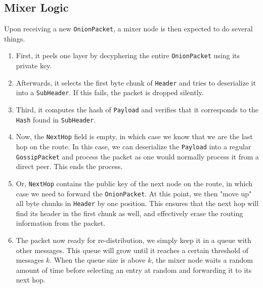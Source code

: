 \documentclass[11pt, a4paper]{article}
\begin{document}
            \subsection{Mixer Logic}\label{subsec:mixer-logic}

            Upon receiving a new \texttt{OnionPacket}, a mixer node is then expected to do several things.

            \begin{enumerate}
                \item First, it peels one layer by decyphering the entire \texttt{OnionPacket} using its private key.

                \item Afterwards, it selects the first byte chunk of \texttt{Header} and tries to deserialize it into a \texttt{SubHeader}. If this fails, the packet is dropped silently.

                \item Third, it computes the hash of \texttt{Payload} and verifies that it corresponds to the \texttt{Hash} found in \texttt{SubHeader}.

                \item Now,  the \texttt{NextHop} field is empty, in which case we know that we are the last hop on the route.
                In this case, we can deserialize the \texttt{Payload} into a regular \texttt{GossipPacket} and process the packet as one would normally process it from a direct peer. This ends the process.
                \item Or, \texttt{NextHop} contains the public key of the next node on the route, in which case we need to forward the \texttt{OnionPacket}.
                At this point, we then "move up" all byte chunks in \texttt{Header} by one position.
                This ensures that the next hop will find its header in the first chunk as well, and effectively erase the routing information from the packet.
                \item The packet now ready for re-distribution, we simply keep it in a queue with other messages.
                This queue will grow until it reaches a certain threshold of messages $k$.
                When the queue size is above $k$, the mixer node waits a random amount of time before selecting an entry at random and forwarding it to its next hop.

            \end{enumerate}


\end{document}
